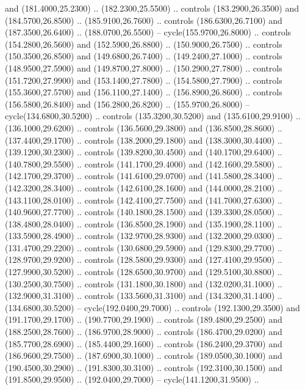 {\begin{scope}[y=0.80pt, x=0.80pt, yscale=-1, xscale=1, inner sep=0pt, outer sep=0pt, #1]
      and (181.4000,25.2300) .. (182.2300,25.5500) .. controls (183.2900,26.3500)
      and (184.5700,26.8500) .. (185.9100,26.7600) .. controls (186.6300,26.7100)
      and (187.3500,26.6400) .. (188.0700,26.5500) -- cycle(155.9700,26.8000) ..
      controls (154.2800,26.5600) and (152.5900,26.8800) .. (150.9000,26.7500) ..
      controls (150.3500,26.8500) and (149.6800,26.7400) .. (149.2400,27.1000) ..
      controls (148.9500,27.5900) and (149.8700,27.8000) .. (150.2900,27.7800) ..
      controls (151.7200,27.9900) and (153.1400,27.7800) .. (154.5800,27.7900) ..
      controls (155.3600,27.5700) and (156.1100,27.1400) .. (156.8900,26.8600) ..
      controls (156.5800,26.8400) and (156.2800,26.8200) .. (155.9700,26.8000) --
      cycle(134.6800,30.5200) .. controls (135.3200,30.5200) and (135.6100,29.9100)
      .. (136.1000,29.6200) .. controls (136.5600,29.3800) and (136.8500,28.8600) ..
      (137.4400,29.1700) .. controls (138.2000,29.1800) and (138.3000,30.4400) ..
      (139.1200,30.2300) .. controls (139.8200,30.4500) and (140.1700,29.6400) ..
      (140.7800,29.5500) .. controls (141.1700,29.4000) and (142.1600,29.5800) ..
      (142.1700,29.3700) .. controls (141.6100,29.0700) and (141.5800,28.3400) ..
      (142.3200,28.3400) .. controls (142.6100,28.1600) and (144.0000,28.2100) ..
      (143.1100,28.0100) .. controls (142.4100,27.7500) and (141.7000,27.6300) ..
      (140.9600,27.7700) .. controls (140.1800,28.1500) and (139.3300,28.0500) ..
      (138.4800,28.0400) .. controls (136.8500,28.1900) and (135.1900,28.1100) ..
      (133.5900,28.4900) .. controls (132.9700,28.9300) and (132.2000,29.0300) ..
      (131.4700,29.2200) .. controls (130.6800,29.5900) and (129.8300,29.7700) ..
      (128.9700,29.9200) .. controls (128.5800,29.9300) and (127.4100,29.9500) ..
      (127.9900,30.5200) .. controls (128.6500,30.9700) and (129.5100,30.8800) ..
      (130.2500,30.7500) .. controls (131.1800,30.1800) and (132.0200,31.1000) ..
      (132.9000,31.3100) .. controls (133.5600,31.3100) and (134.3200,31.1400) ..
      (134.6800,30.5200) -- cycle(192.0400,29.7000) .. controls (192.1300,29.3500)
      and (191.1700,29.1700) .. (190.7700,29.1900) .. controls (189.4800,29.2500)
      and (188.2500,28.7600) .. (186.9700,28.9000) .. controls (186.4700,29.0200)
      and (185.7700,28.6900) .. (185.4400,29.1600) .. controls (186.2400,29.3700)
      and (186.9600,29.7500) .. (187.6900,30.1000) .. controls (189.0500,30.1000)
      and (190.4500,30.2900) .. (191.8300,30.3100) .. controls (192.3100,30.1500)
      and (191.8500,29.9500) .. (192.0400,29.7000) -- cycle(141.1200,31.9500) ..

\end{scope}}
